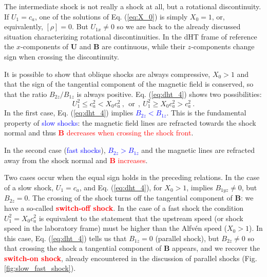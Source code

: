 \documentclass[12pt,a4paper]{article}
\renewcommand{\vec}[1]{\boldsymbol{#1}}
\begin{document}
The intermediate shock is not really a shock at all, but a rotational discontinuity. If $U_1 = c_a$, one of the solutions of Eq. (\ref{eq:X_0}) is simply $X_0 = 1$, or, equivalently, $[\rho] = 0$. But $U_{1x} \neq 0$ so we are back to the already discussed situation characterizing rotational discontinuities. In the dHT frame of reference the $x$-components of $\vec{U}$ and $\vec{B}$ are continuous, while their $z$-components change sign when crossing the discontinuity.

It is possible to show that oblique shocks are always compressive, $X_0 > 1$ and that the sign of the tangential component of the magnetic field is conserved, so that the ratio $B_{2z}/B_{1z}$ is always positive. Eq. (\ref{eq:dht_4}) shows two possibilities:
\begin{equation*}
U_1^2 \leqslant c_a^2 < X_0 c_a^2 ~, ~~\text{or} ~~ , ~ U_1^2 \geqslant  X_0 c_a^2 > c_a^2 ~.
\end{equation*}
In the first case, Eq. (\ref{eq:dht_4}) implies \textcolor{blue}{$B_{2z} < B_{1z}$}. This is the fundamental property of \textcolor{blue}{slow shocks}: the magnetic field lines are refracted towards the shock normal and thus \textcolor{red}{$\vec{B}$ decreases when crossing the shock front}. 

In the second case (\textcolor{blue}{fast shocks}), \textcolor{blue}{$B_{2z} > B_{1z}$} and the magnetic lines are refracted away from the shock normal and \textcolor{red}{$\vec{B}$ increases}.

Two cases occur when the equal sign holds in the preceding relations. In the case of a slow shock, $U_1 = c_a$, and Eq. (\ref{eq:dht_4}), for $X_0 > 1$, implies $B_{1yz} \neq 0$, but $B_{2z} = 0$. The crossing of the shock turns off the tangential component of $\vec{B}$: we have a so-called \textcolor{red}{\bf switch-off shock}. In the case of a fast shock the condition $U_1^2 = X_0 c_a^2$ is equivalent to the statement that the upstream speed (or shock speed in the laboratory frame) must be higher than the Alfv\'en speed ($X_0 > 1$). In this case, Eq. (\ref{eq:dht_4}) tells us that $B_{1z} = 0$ (parallel shock), but $B_{2z} \neq 0$ so that crossing the shock a tangential component of $\vec{B}$ appears, and we recover the \textcolor{red}{\bf switch-on shock}, already encountered in the discussion of parallel shocks (Fig. \ref{fig:slow_fast_shock}).
\end{document}
